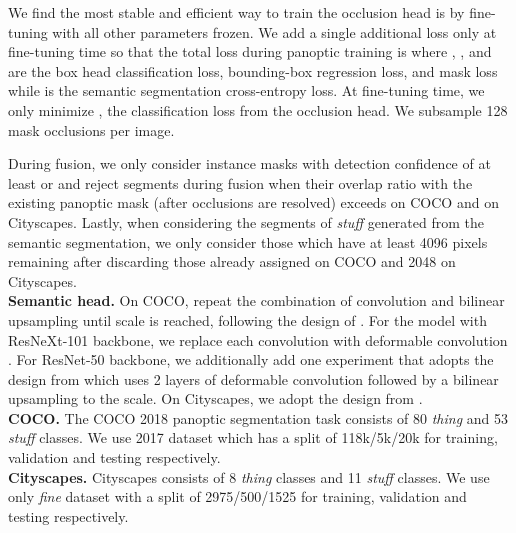 \documentclass[10pt,twocolumn,letterpaper]{article}
\begin{document}
We find the most stable and efficient way to train the occlusion head is by fine-tuning with all other parameters frozen. We add a single additional loss only at fine-tuning time so that the total loss during panoptic training is  where , , and  are the box head classification loss, bounding-box regression loss, and mask loss while  is the semantic segmentation cross-entropy loss. At fine-tuning time, we only minimize , the classification loss from the occlusion head. We subsample 128 mask occlusions per image.

During fusion, we only consider instance masks with detection confidence of at least  or  and reject segments during fusion when their overlap ratio with the existing panoptic mask (after occlusions are resolved) exceeds  on COCO and  on Cityscapes. Lastly, when considering the segments of \textit{stuff} generated from the semantic segmentation, we only consider those which have at least 4096 pixels remaining after discarding those already assigned on COCO and 2048 on Cityscapes.\\
\noindent \textbf{Semantic head.} On COCO, repeat the combination of  convolution and  bilinear upsampling until  scale is reached, following the design of \cite{kirillov2019panoptic}. For the model with ResNeXt-101 backbone, we replace each convolution with deformable convolution \cite{deformable-conv}. For ResNet-50 backbone, we additionally add one experiment that adopts the design from \cite{xiong2019upsnet} which uses 2 layers of deformable convolution followed by a bilinear upsampling to the  scale. On Cityscapes, we adopt the design from \cite{xiong2019upsnet}. \\
\noindent \textbf{COCO.} The COCO 2018 panoptic segmentation task consists of 80 \textit{thing} and 53 \textit{stuff} classes. We use 2017 dataset which has a split of 118k/5k/20k for training, validation and testing respectively.\\
\noindent \textbf{Cityscapes.} Cityscapes consists of 8 \textit{thing} classes and 11 \textit{stuff} classes. We use only \textit{fine} dataset with a split of 2975/500/1525 for training, validation and testing respectively.\\
\end{document}

